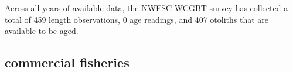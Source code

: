 \documentclass[11pt,
  english,
  letterpaper,
]{article}
\begin{document}

Across all years of available data, the NWFSC WCGBT survey has collected a total of 459 length observations, 0 age readings, and 407 otoliths that are available to be aged.

\leavevmode\tagmcend\tagstructend\par


\hypertarget{commercial-fisheries-53}{%
\subsection{commercial fisheries}\label{commercial-fisheries-53}}

\leavevmode\tagmcend\tagstructend


\begingroup\fontsize{10}{12}\selectfont \begingroup\fontsize{10}{12}\selectfont

\leavevmode\tagmcend\tagstructend\par
\end{document}
